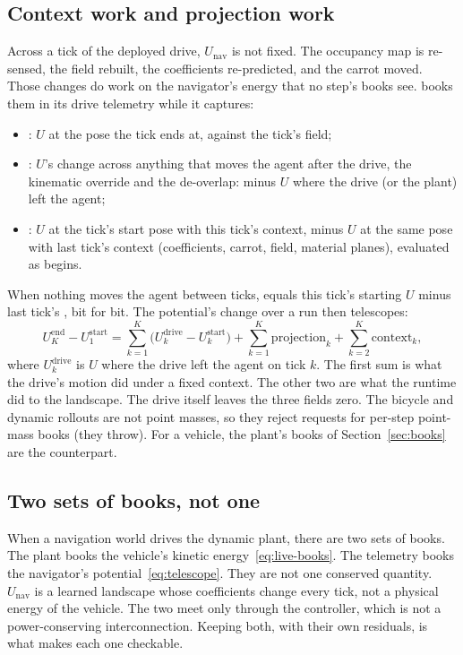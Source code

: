 \documentclass[11pt]{article}
\theoremstyle{remark}
\begin{document}
\subsection{Context work and projection work}
Across a tick of the deployed drive, $U_{\mathrm{nav}}$ is not fixed. The occupancy map is re-sensed,
the field rebuilt, the coefficients re-predicted, and the carrot moved. Those changes do work on
the navigator's energy that no step's books see.  books them in its drive
telemetry while it captures:
\begin{itemize}
  \item {}: $U$ at the pose the tick ends at, against the tick's field;
  \item {}: $U$'s change across anything that moves the agent after the drive,
        the kinematic override and the  de-overlap:  minus $U$
        where the drive (or the plant) left the agent;
  \item {}: $U$ at the tick's start pose with this tick's context, minus $U$ at
        the same pose with last tick's context (coefficients, carrot, field, material planes),
        evaluated as  begins.
\end{itemize}
When nothing moves the agent between ticks,  equals this tick's starting $U$
minus last tick's , bit for bit. The potential's change over a run then
telescopes:
\begin{equation}
  U_K^{\mathrm{end}}-U_1^{\mathrm{start}}=\sum_{k=1}^K\big(U_k^{\mathrm{drive}}-U_k^{\mathrm{start}}\big)
  +\sum_{k=1}^K\text{projection}_k+\sum_{k=2}^K\text{context}_k ,
  \label{eq:telescope}
\end{equation}
where $U_k^{\mathrm{drive}}$ is $U$ where the drive left the agent on tick $k$. The first sum is
what the drive's motion did under a fixed context. The other two are what the runtime did to the
landscape. The drive itself leaves the three fields zero. The bicycle and dynamic rollouts are not
point masses, so they reject requests for per-step point-mass books (they throw). For a vehicle,
the plant's books of Section~\ref{sec:books} are the counterpart.

\subsection{Two sets of books, not one}
\label{sec:two-books}
When a navigation world drives the dynamic plant, there are two sets of books. The plant books
the vehicle's kinetic energy~\eqref{eq:live-books}. The telemetry books the navigator's
potential~\eqref{eq:telescope}. They are not one conserved quantity. $U_{\mathrm{nav}}$ is a
learned landscape whose coefficients change every tick, not a physical energy of the vehicle. The
two meet only through the controller, which is not a power-conserving interconnection. Keeping
both, with their own residuals, is what makes each one checkable.
\end{document}
